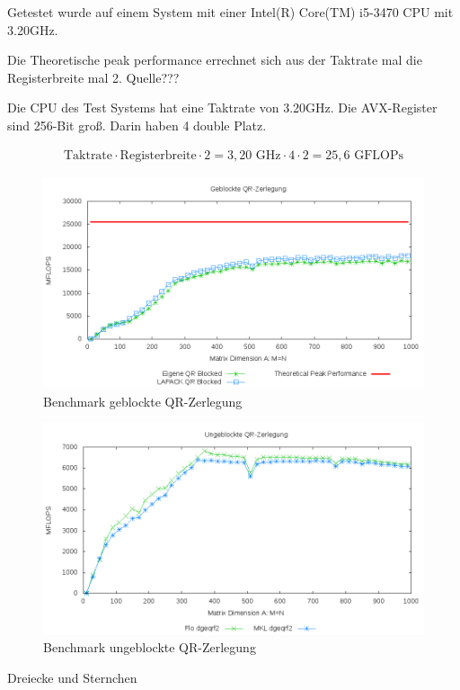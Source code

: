Getestet wurde auf einem System mit einer Intel(R) Core(TM) i5-3470 CPU mit 3.20GHz. 

Die Theoretische peak performance errechnet sich aus der Taktrate mal die Registerbreite mal 2. Quelle???


Die CPU des Test Systems hat eine Taktrate von 3.20GHz.
Die AVX-Register sind 256-Bit groß. Darin haben 4 double Platz.

\begin{align*}
	\text{Taktrate} \cdot \text{Registerbreite} \cdot 2= 3,20 \text{ GHz} \cdot 4 \cdot 2 = 25,6 \text{ GFLOPs}
\end{align*}

\begin{figure}[H]
	\includegraphics[width=\textwidth]{images/blk.png}
	\caption{Benchmark geblockte QR-Zerlegung}
	\label{img:blk}
\end{figure}

\begin{figure}[H]
	\includegraphics[width=\textwidth]{images/unblk.png}
	\caption{Benchmark ungeblockte QR-Zerlegung}
	\label{img:unblk}
\end{figure}

Dreiecke und Sternchen









	 
